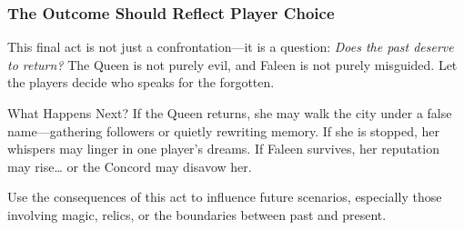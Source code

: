 \subsubsection{The Outcome Should Reflect Player Choice}

This final act is not just a confrontation—it is a question: \emph{Does the past deserve to return?} The Queen is not purely evil, and Faleen is not purely misguided. Let the players decide who speaks for the forgotten.

\begin{CommentBox}{What Happens Next?}
    If the Queen returns, she may walk the city under a false name—gathering followers or quietly rewriting memory. If she is stopped, her whispers may linger in one player’s dreams. If Faleen survives, her reputation may rise… or the Concord may disavow her.

    Use the consequences of this act to influence future scenarios, especially those involving magic, relics, or the boundaries between past and present.
\end{CommentBox}
